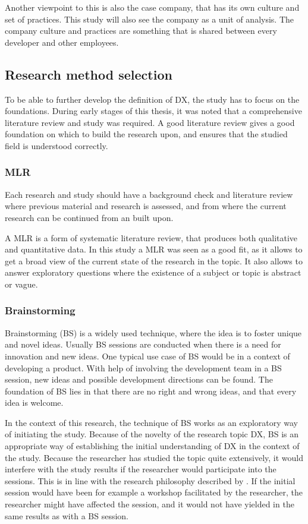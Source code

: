 \documentclass[english, 12pt, a4paper, sci, utf8, a-1b, online]{aaltothesis}
\begin{document}
Another viewpoint to this is also the case company, that has its own culture and set of practices. This study will also see the company as a unit of analysis. The company culture and practices are something that is shared between every developer and other employees.   

\subsection{Research method selection}

To be able to further develop the definition of DX, the study has to focus on the foundations. During early stages of this thesis, it was noted that a comprehensive literature review and study was required. A good literature review gives a good foundation on which to build the research upon, and ensures that the studied field is understood correctly.

\subsubsection{MLR}

Each research and study should have a background check and literature review where previous material and research is assessed, and from where the current research can be continued from an built upon.

A MLR is a form of systematic literature review, that produces both qualitative and quantitative data. In this study a MLR was seen as a good fit, as it allows to get a broad view of the current state of the research in the topic. It also allows to answer exploratory questions where the existence of a subject or topic is abstract or vague.

\subsubsection{Brainstorming}

Brainstorming (BS) is a widely used technique, where the idea is to foster unique and novel ideas. Usually BS sessions are conducted when there is a need for innovation and new ideas. One typical use case of BS would be in a context of developing a product. With help of involving the development team in a BS session, new ideas and possible development directions can be found. The foundation of BS lies in that there are no right and wrong ideas, and that every idea is welcome.

In the context of this research, the technique of BS works as an exploratory way of initiating the study. Because of the novelty of the research topic DX, BS is an appropriate way of establishing the initial understanding of DX in the context of the study. Because the researcher has studied the topic quite extensively, it would interfere with the study results if the researcher would participate into the sessions. This is in line with the research philosophy described by \cite{ethnographically-informed}. If the initial session would have been for example a workshop facilitated by the researcher, the researcher might have affected the session, and it would not have yielded in the same results as with a BS session.
\end{document}
